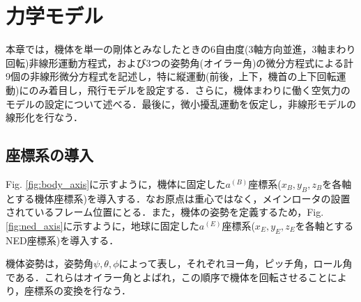 
\chapter{力学モデル}
\label{model}

本章では，機体を単一の剛体とみなしたときの6自由度(3軸方向並進，3軸まわり回転)非線形運動方程式，および3つの姿勢角(オイラー角)の微分方程式による計9個の非線形微分方程式を記述し，特に縦運動(前後，上下，機首の上下回転運動)にのみ着目し，飛行モデルを設定する．さらに，機体まわりに働く空気力のモデルの設定について述べる．最後に，微小擾乱運動を仮定し，非線形モデルの線形化を行なう．

\section{座標系の導入}
\label{sec:axis}

Fig. \ref{fig:body_axis}に示すように，機体に固定した$a^{(B)}$座標系($x_B,y_B,z_B$を各軸とする機体座標系)を導入する．なお原点は重心ではなく，メインロータの設置されているフレーム位置にとる．また，機体の姿勢を定義するため，Fig. \ref{fig:ned_axis}に示すように，地球に固定した$a^{(E)}$座標系($x_E,y_E,z_E$を各軸とするNED座標系)を導入する．

機体姿勢は，姿勢角$\psi,\theta,\phi$によって表し，それぞれヨー角，ピッチ角，ロール角である．これらはオイラー角とよばれ，この順序で機体を回転させることにより，座標系の変換を行なう．


